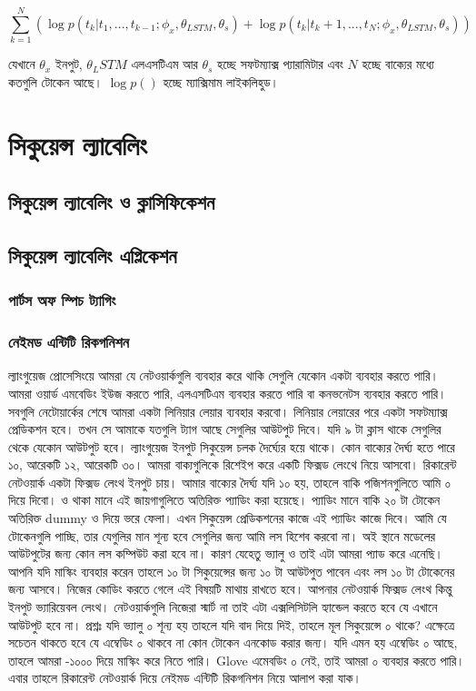 \documentclass{article}[book]
\begin{document}
\begin{equation}
\sum_{k=1}^{N} (\log p(t_k|t_1,...,t_{k-1}; \phi_x, \theta_{LSTM}, \theta_s) + \log p(t_k|t_k+1,...,t_{N}; \phi_x, \theta_{LSTM}, \theta_s) )
\end{equation}

যেখানে $\theta_x$ ইনপুট, $\theta_LSTM$ এলএসটিএম আর $\theta_s$ হচ্ছে সফটম্যাক্স প্যারামিটার এবং $N$ হচ্ছে বাক্যের মধ্যে কতগুলি টোকেন আছে। $\log p()$ হচ্ছে ম্যাক্সিমাম লাইকলিহুড। 


\section{সিকুয়েন্স ল্যাবেলিং }
\subsection{সিকুয়েন্স ল্যাবেলিং ও ক্লাসিফিকেশন}
\subsection{সিকুয়েন্স ল্যাবেলিং এপ্লিকেশন}
\subsubsection{পার্টস অফ স্পিচ ট্যাগিং}
\subsubsection{নেইমড এন্টিটি রিকগনিশন}
ল্যাংগুয়েজ প্রোসেসিংয়ে আমরা যে নেটওয়ার্কগুলি ব্যবহার করে থাকি সেগুলি যেকোন একটা ব্যবহার করতে পারি। আমরা ওয়ার্ড এমবেডিং ইউজ করতে পারি, এলএসটিএম ব্যবহার করতে পারি বা কনভনেটস ব্যবহার করতে পারি। সবগুলি নেটোয়ার্কের শেষে আমরা একটা লিনিয়ার লেয়ার ব্যবহার করবো। লিনিয়ার লেয়ারের পরে একটা সফটম্যাক্স প্রেডিকশন হবে। তখন সে আমাকে যতগুলি ট্যাগ আছে সেগুলির আউটপুট দিবে। যদি ৯ টা ক্লাস থাকে সেগুলির থেকে যেকোন আউটপুট হবে। ল্যাংগুয়েজ ইনপুট সিকুয়েন্স চলক দৈর্ঘ্যের হয়ে থাকে। কোন বাক্যের দৈর্ঘ্য হতে পারে ১০, আরেকটি ১২, আরেকটি ৩০। আমরা বাক্যগুলিকে রিশেইপ করে একটি ফিক্সড লেংথে নিয়ে আসবো। রিকারেন্ট নেটওয়ার্ক একটা ফিক্সড লেংথ ইনপুট চায়। আমার বাক্যের দৈর্ঘ্য যদি ১০ হয়, তাহলে বাকি পজিশনগুলিতে আমি ০ দিয়ে দিবো। ও থাকা মানে এই জায়গাগুলিতে অতিরিক্ত প্যাডিং করা হয়েছে। প্যাডিং মানে বাকি ২০ টা টোকেন অতিরিক্ত dummy ও দিয়ে ভরে ফেলা। এখন সিকুয়েন্স প্রেডিকশনের কাজে এই প্যাডিং কাজে দিবে। আমি যে টোকেনগুলি পাচ্ছি, তার যেগুলির মান শূন্য হবে সেগুলির জন্য আমি লস হিশেব করবো না। অই স্থানে মডেলের আউটপুটের জন্য কোন লস কম্পিউট করা হবে না। কারণ যেহেতু ভ্যালু ও তাই এটা আমরা প্যাড করে এনেছি। আপনি যদি মাস্কিং ব্যবহার করেন তাহলে ১০ টা সিকুয়েন্সের জন্য ১০ টা আউটপুত পাবেন এবং লস ১০ টা টোকেনের জন্য আসবে। নিজের কোডিং করতে গেলে এই বিষয়টি মাথায় রাখতে হবে। আপনার নেটওয়ার্ক ফিক্সড লেংথ কিন্তু ইনপুট ভ্যারিয়েবল লেংথ। নেটওয়ার্কগুলি নিজেরা স্মার্ট না তাই এটা এক্সলিসিটলি হ্যান্ডেল করতে হবে যে এখানে আউটপুট হবে না। প্রশ্নঃ যদি ভ্যালু ০ শূন্য হয় তাহলে যদি বাদ দিয়ে দিই, তাহলে মূল সিকুয়েন্সে ০ থাকে? এক্ষেত্রে সচেতন থাকতে হবে যে এম্বেডিং ০ থাকবে না কোন টোকেন এনকোড করার জন্য। যদি এমন হয় এম্বেডিং ০ আছে, তাহলে আমরা -১০০০ দিয়ে মাস্কিং করে নিতে পারি। Glove এমেবডিং ০ নেই, তাই আমরা ০ ব্যবহার করতে পারি। এবার তাহলে রিকারেন্ট নেটওয়ার্ক দিয়ে নেইমড এন্টিটি রিকগনিশন নিয়ে আলাপ করা যাক। 
\end{document}
